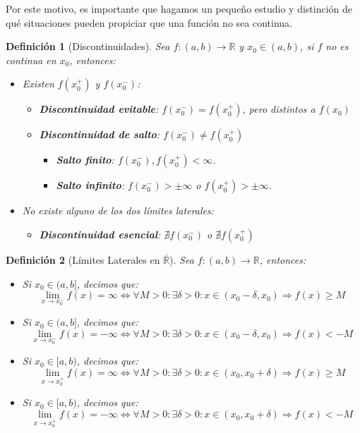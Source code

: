 \documentclass[10pt,a4paper,openright]{book}
\theoremstyle{break}
\newtheorem{defi}{Definición}[chapter]
\begin{document}
Por este motivo, es importante que hagamos un pequeño estudio y distinción de qué situaciones pueden propiciar que una función no sea continua.

\begin{defi}[Discontinuidades]
Sea $f: (a,b)\longrightarrow \mathbb R$ y $x_0\in (a,b)$, si $f$ no es continua en $x_0$, entonces:
\begin{itemize}
\item Existen $f(x_0^+)$ y $f(x_0^-)$:
	\begin{itemize}
	\item \textbf{Discontinuidad evitable}: $f(x_0^-)=f(x_0^+)$, pero distintos a $f(x_0)$
	\item \textbf{Discontinuidad de salto}: $f(x_0^-)\neq f(x_0^+)$
		\begin{itemize}
		\item \textbf{Salto finito}: $f(x_0^-), f(x_0^+) < \infty$.
		\item \textbf{Salto infinito}: $f(x_0^-) > \pm\infty$ o $f(x_0^+) > \pm\infty$.
		\end{itemize}
	\end{itemize}
	
\item No existe alguno de los dos límites laterales:
	\begin{itemize}
	\item \textbf{Discontinuidad esencial}: $\nexists f(x_0^-)$ o $\nexists f(x_0^+)$
	\end{itemize}
\end{itemize}
\end{defi}

\begin{defi}[Límites Laterales en $\bar{\mathbb{R}}$]
Sea $f: (a,b)\longrightarrow \mathbb R$, entonces:
\begin{itemize}
\item Si $x_0\in (a,b]$, decimos que:
$$\lim_{x\rightarrow x_0^-}f(x)=\infty\Leftrightarrow \forall M>0: \exists \delta>0: x\in (x_0-\delta, x_0)\Rightarrow f(x)\geq M$$

\item Si $x_0\in (a,b]$, decimos que:
$$\lim_{x\rightarrow x_0^-}f(x)=-\infty\Leftrightarrow \forall M>0: \exists \delta>0: x\in (x_0-\delta, x_0)\Rightarrow f(x)< -M$$

\item Si $x_0\in [a,b)$, decimos que:
$$\lim_{x\rightarrow x_0^+}f(x)=\infty\Leftrightarrow \forall M>0: \exists \delta>0: x\in (x_0,x_0+\delta)\Rightarrow f(x)\geq M$$

\item Si $x_0\in [a,b)$, decimos que:
$$\lim_{x\rightarrow x_0^+}f(x)=-\infty\Leftrightarrow \forall M>0: \exists \delta>0: x\in (x_0,x_0+\delta)\Rightarrow f(x)< -M$$
\end{itemize}
\end{defi}
\end{document}
